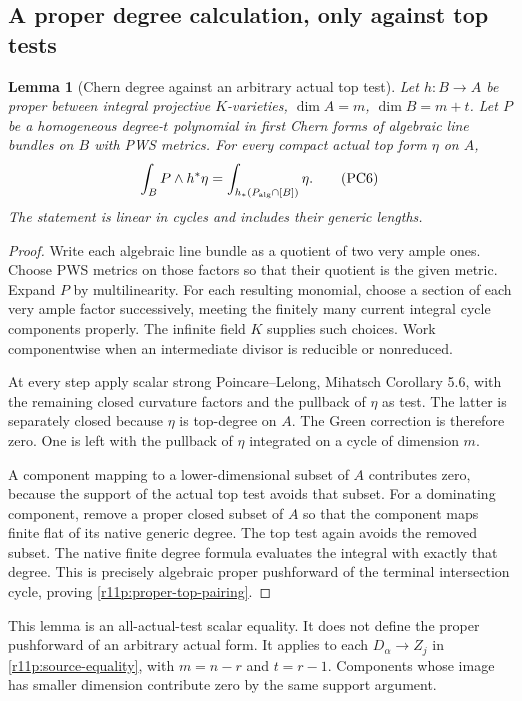 \documentclass[11pt,a4paper]{article}
\newtheorem{lemma}[theorem]{Lemma}
\theoremstyle{definition}
\theoremstyle{remark}
\begin{document}
\subsection{A proper degree calculation, only against top tests}

\begin{lemma}[Chern degree against an arbitrary actual top test]
\label{r11p:proper-chern-degree}
Let $h:B\to A$ be proper between integral projective $K$-varieties,
$\dim A=m$, $\dim B=m+t$.  Let $P$ be a homogeneous degree-$t$
polynomial in first Chern forms of algebraic line bundles on $B$
with PWS metrics.  For every compact actual top form $\eta$ on $A$,
\[
              \int_BP\wedge h^*\eta
                =\int_{h_*(P_{\rm alg}\cap[B])}\eta.
\tag{PC6}\label{r11p:proper-top-pairing}
\]
The statement is linear in cycles and includes their generic lengths.
\end{lemma}

\begin{proof}
Write each algebraic line bundle as a quotient of two very ample ones.
Choose PWS metrics on those factors so that their quotient is the
given metric.  Expand $P$ by multilinearity.  For each resulting
monomial, choose a section of each very ample factor successively,
meeting the finitely many current integral cycle components properly.
The infinite field $K$ supplies such choices.  Work componentwise
when an intermediate divisor is reducible or nonreduced.

At every step apply scalar strong Poincare--Lelong, Mihatsch
Corollary 5.6, with the remaining closed curvature factors and the
pullback of $\eta$ as test.  The latter is separately closed because
$\eta$ is top-degree on $A$.  The Green correction is therefore zero.
One is left with the pullback of $\eta$ integrated on a cycle of
dimension $m$.

A component mapping to a lower-dimensional subset of $A$ contributes
zero, because the support of the actual top test avoids that subset.
For a dominating component, remove a proper closed subset of $A$
so that the component maps finite flat of its native generic degree.
The top test again avoids the removed subset.  The native finite
degree formula evaluates the integral with exactly that degree.
This is precisely algebraic proper pushforward of the terminal
intersection cycle, proving \eqref{r11p:proper-top-pairing}.
\end{proof}

This lemma is an all-actual-test scalar equality.  It does not define
the proper pushforward of an arbitrary actual form.  It applies to
each $D_\alpha\to Z_j$ in \eqref{r11p:source-equality}, with
$m=n-r$ and $t=r-1$.  Components whose image has smaller dimension
contribute zero by the same support argument.
\end{document}
